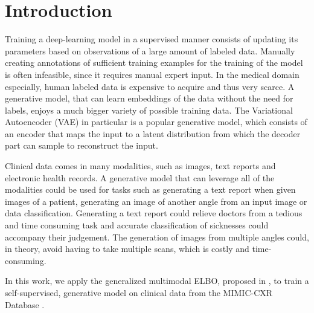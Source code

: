 \section{Introduction}

	Training a deep-learning model in a supervised manner consists of updating its parameters based on observations of a large amount of labeled data.
	Manually creating annotations of sufficient training examples for the training of the model is often infeasible, since it requires manual expert input.
	In the medical domain especially, human labeled data is expensive to acquire and thus very scarce.
	A generative model, that can learn embeddings of the data without the need for labels, enjoys a much bigger variety of possible training data.
	The Variational Autoencoder (VAE) \cite{doersch2016tutorial} in particular is a popular generative model, which consists of an encoder that maps the input to a latent distribution from which the decoder part can sample to reconstruct the input.

	Clinical data comes in many modalities, such as images, text reports and electronic health records.
	A generative model that can leverage all of the modalities could be used for tasks such as generating a text report when given images of a patient, generating an image of another angle from an input image or data classification.
	Generating a text report could relieve doctors from a tedious and time consuming task and accurate classification of sicknesses could accompany their judgement.
	The generation of images from multiple angles could, in theory, avoid having to take multiple scans, which is costly and time-consuming.

	In this work, we apply the generalized multimodal ELBO, proposed in \cite{thomas_gener-ELBO}, to train a self-supervised, generative model on clinical data from the MIMIC-CXR Database \cite{johnson2019mimic}.

